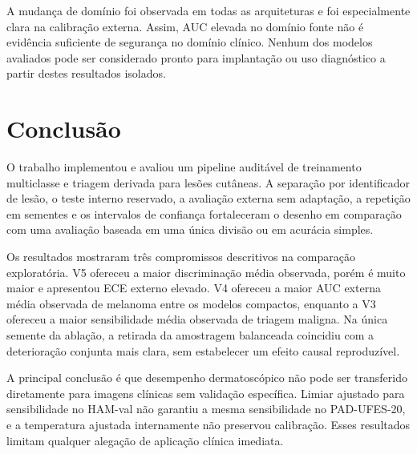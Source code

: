 \documentclass[oneside,english,brazilian]{UNISINOSmonografia}
\begin{document}
A mudança de domínio foi observada em todas as arquiteturas e foi especialmente clara na calibração externa. Assim, AUC elevada no domínio fonte não é evidência suficiente de segurança no domínio clínico. Nenhum dos modelos avaliados pode ser considerado pronto para implantação ou uso diagnóstico a partir destes resultados isolados.

\chapter{Conclusão}

O trabalho implementou e avaliou um pipeline auditável de treinamento multiclasse e triagem derivada para lesões cutâneas. A separação por identificador de lesão, o teste interno reservado, a avaliação externa sem adaptação, a repetição em sementes e os intervalos de confiança fortaleceram o desenho em comparação com uma avaliação baseada em uma única divisão ou em acurácia simples.

Os resultados mostraram três compromissos descritivos na comparação exploratória. V5 ofereceu a maior discriminação média observada, porém é muito maior e apresentou ECE externo elevado. V4 ofereceu a maior AUC externa média observada de melanoma entre os modelos compactos, enquanto a V3 ofereceu a maior sensibilidade média observada de triagem maligna. Na única semente da ablação, a retirada da amostragem balanceada coincidiu com a deterioração conjunta mais clara, sem estabelecer um efeito causal reproduzível.

A principal conclusão é que desempenho dermatoscópico não pode ser transferido diretamente para imagens clínicas sem validação específica. Limiar ajustado para sensibilidade no HAM-val não garantiu a mesma sensibilidade no PAD-UFES-20, e a temperatura ajustada internamente não preservou calibração. Esses resultados limitam qualquer alegação de aplicação clínica imediata.
\end{document}
